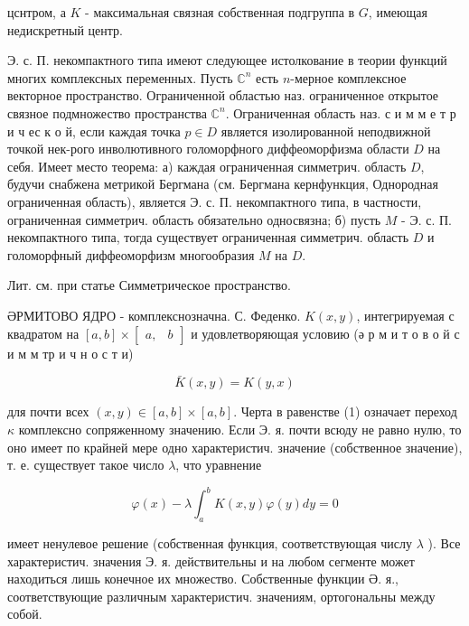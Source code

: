 \documentclass[10pt]{article}
\begin{document}
цснтром, а $K$ - максимальная связная собственная подгруппа в $G$, имеющая недискретный центр.



Э. с. П. некомпактного типа имеют следующее истолкование в теории функций многих комплексных переменных. Пусть $\mathbb{C}^{n}$ есть $n$-мерное комплексное векторное пространство. Ограниченной областью наз. ограниченное открытое связное подмножество пространства $\mathbb{C}^{n}$. Ограниченная область наз. с и м м е т р и ч ес к о й, если каждая точка $p \in D$ является изолированной неподвижной точкой нек-рого инволютивного голоморфного диффеоморфизма области $D$ на себя. Имеет место теорема: а) каждая ограниченная симметрич. область $D$, будучи снабжена метрикой Бергмана (см. Бергмана кернфункция, Однородная ограниченная область), является Э. с. П. некомпактного типа, в частности, ограниченная симметрич. область обязательно односвязна; б) пусть $M$ - Э. с. П. некомпактного типа, тогда существует ограниченная симметрич. область $D$ и голоморфный диффеоморфизм многообразия $M$ на $D$.



Лит. см. при статье Симметрическое пространство.



ӘРМИТОВО ЯДРО - комплекснозначна. С. Феденко. $K(x, y)$, интегрируемая с квадратом на $[a, b] \times\left[\begin{array}{ll}a, & b\end{array}\right]$ и удовлетворяющая условию (ә р м и т о в о й с и м м тр и ч н о с т и)



\[

\bar{K}(x, y)=K(y, x)

\]



для почти всех $(x, y) \in[a, b] \times[a, b]$. Черта в равенстве (1) означает переход $\kappa$ комплексно сопряженному значению. Если Э. я. почти всюду не равно нулю, то оно имеет по крайней мере одно характеристич. значение (собственное значение), т. е. существует такое число $\lambda$, что уравнение



\[

\varphi(x)-\lambda \int_{a}^{b} K(x, y) \varphi(y) d y=0

\]



имеет ненулевое решение (собственная функция, соответствующая числу $\lambda$ ). Все характеристич. значения Э. я. действительны и на любом сегменте может находиться лишь конечное их множество. Собственные функции Ә. я., соответствующие различным характеристич. значениям, ортогональны между собой.
\end{document}
